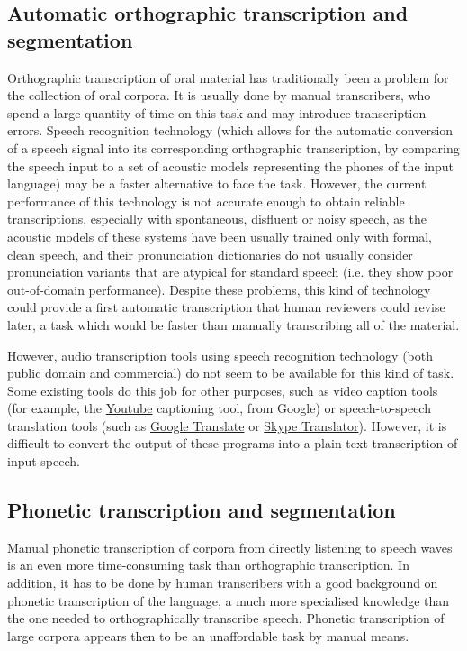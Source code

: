 \documentclass[output=paper]{langsci/langscibook}
\begin{document}
\subsection{Automatic orthographic transcription and segmentation}

Orthographic transcription of oral material has traditionally been a problem for the collection of oral corpora. It is usually done by manual transcribers, who spend a large quantity of time on this task and may introduce transcription errors. Speech recognition technology (which allows for the automatic conversion of a speech signal into its corresponding orthographic transcription, by comparing the speech input to a set of acoustic models representing the phones of the input language) may be a faster alternative to face the task. However, the current performance of this technology is not accurate enough to obtain reliable transcriptions, especially with spontaneous, disfluent or noisy speech, as the acoustic models of these systems have been usually trained only with formal, clean speech, and their pronunciation dictionaries do not usually consider pronunciation variants that are atypical for standard speech (i.e. they show poor out-of-domain performance). Despite these problems, this kind of technology could provide a first automatic transcription that human reviewers could revise later, a task which would be faster than manually transcribing all of the material.

However, audio transcription tools using speech recognition technology (both public domain and commercial) do not seem to be available for this kind of task. Some existing tools do this job for other purposes, such as video caption tools (for example, the \href{https://support.google.com/youtube/answer/3038280?hl=en}{Youtube} captioning tool, from Google) or speech-to-speech translation tools (such as \href{https://support.google.com/translate/answer/6142468?hl=en}{Google Translate} or \href{http://www.skype.com/en/translator-preview/}{Skype Translator}). However, it is difficult to convert the output of these programs into a plain text transcription of input speech.

\subsection{Phonetic transcription and segmentation}

Manual phonetic transcription of corpora from directly listening to speech waves is an even more time-consuming task than orthographic transcription. In addition, it has to be done by human transcribers with a good background on phonetic transcription of the language, a much more specialised knowledge than the one needed to orthographically transcribe speech. Phonetic transcription of large corpora appears then to be an unaffordable task by manual means.
\end{document}
